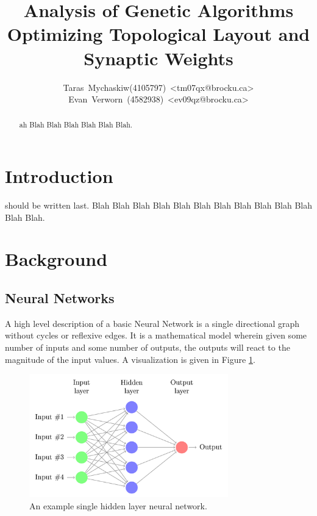 \documentclass[journal]{IEEEtran}
\begin{document}
\title{Analysis of Genetic Algorithms Optimizing Topological Layout and Synaptic Weights }

\author{Taras~Mychaskiw(4105797)~\textless{}tm07qx@brocku.ca\textgreater\\%
Evan~Verworn~(4582938)~\textless{}ev09qz@brocku.ca\textgreater%
}

\maketitle

\begin{abstract}ah Blah Blah Blah Blah Blah Blah.
\end{abstract}

\IEEEpeerreviewmaketitle

\section{Introduction}
 should be written last. Blah Blah Blah Blah Blah Blah Blah Blah Blah Blah Blah Blah Blah.

\section{Background}

  \subsection{Neural Networks}
  A high level description of a basic Neural Network is a single directional graph without
  cycles or reflexive edges. It is a mathematical model wherein given some number of inputs
  and some number of outputs, the outputs will react to the magnitude of the input values. A
  visualization is given in Figure \ref{fig:NeuralNetwork}.

\begin{figure}[here]%
  \centering
  \includegraphics[width=3.4in]{neural-network}
  \caption{An example single hidden layer neural network.}
  \label{fig:NeuralNetwork}
\end{figure}
\end{document}
